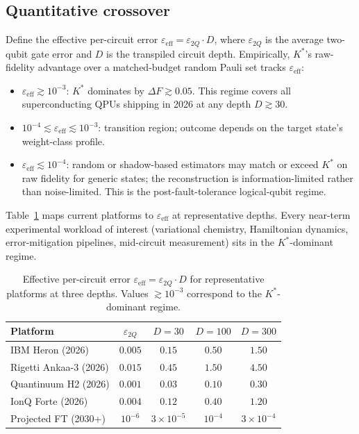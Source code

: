 \documentclass[twocolumn,prx,aps,superscriptaddress,longbibliography]{revtex4-2}
\begin{document}
\subsection{Quantitative crossover}
\label{sm:longevity-crossover}

Define the effective per-circuit error
$\varepsilon_{\mathrm{eff}} = \varepsilon_{2Q} \cdot D$, where
$\varepsilon_{2Q}$ is the average two-qubit gate error and $D$ is
the transpiled circuit depth.
Empirically, $K^*$'s raw-fidelity advantage over a matched-budget
random Pauli set tracks $\varepsilon_{\mathrm{eff}}$:
\begin{itemize}
\item $\varepsilon_{\mathrm{eff}} \gtrsim 10^{-3}$: $K^*$ dominates
  by $\Delta F \gtrsim 0.05$.  This regime covers all
  superconducting QPUs shipping in 2026 at any depth $D \gtrsim 30$.
\item $10^{-4} \lesssim \varepsilon_{\mathrm{eff}} \lesssim 10^{-3}$:
  transition region; outcome depends on the target state's
  weight-class profile.
\item $\varepsilon_{\mathrm{eff}} \lesssim 10^{-4}$: random or
  shadow-based estimators may match or exceed $K^*$ on raw fidelity
  for generic states; the reconstruction is information-limited
  rather than noise-limited.  This is the post-fault-tolerance
  logical-qubit regime.
\end{itemize}

Table~\ref{tab:noise-regime} maps current platforms to
$\varepsilon_{\mathrm{eff}}$ at representative depths.  Every
near-term experimental workload of interest (variational chemistry,
Hamiltonian dynamics, error-mitigation pipelines, mid-circuit
measurement) sits in the $K^*$-dominant regime.

\begin{table}[h]
\centering
\caption{Effective per-circuit error
$\varepsilon_{\mathrm{eff}} = \varepsilon_{2Q} \cdot D$ for
representative platforms at three depths.  Values $\gtrsim 10^{-3}$
correspond to the $K^*$-dominant regime.}
\label{tab:noise-regime}
\begin{tabular}{lcccc}
\hline\hline
Platform & $\varepsilon_{2Q}$ & $D{=}30$ & $D{=}100$ & $D{=}300$ \\
\hline
IBM Heron (2026)        & $0.005$  & $0.15$  & $0.50$  & $1.50$  \\
Rigetti Ankaa-3 (2026)  & $0.015$  & $0.45$  & $1.50$  & $4.50$  \\
Quantinuum H2 (2026)    & $0.001$  & $0.03$  & $0.10$  & $0.30$  \\
IonQ Forte (2026)       & $0.004$  & $0.12$  & $0.40$  & $1.20$  \\
Projected FT (2030+)    & $10^{-6}$ & $3{\times}10^{-5}$
                                    & $10^{-4}$
                                    & $3{\times}10^{-4}$ \\
\hline\hline
\end{tabular}
\end{table}
\end{document}
